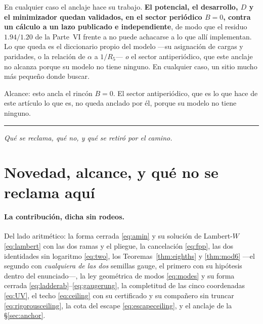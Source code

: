 \documentclass[11pt,a4paper]{article}
\newcommand{\bridge}[1]{\par\medskip\noindent
  \textcolor{hdrblue!45}{\rule{2.2cm}{0.6pt}}\;\;\parbox[t]{0.84\textwidth}{\small\itshape
  \textcolor{hdrblue!85}{#1}}\par\medskip}
\newenvironment{keyeq}
  {\begin{center}\setlength{\fboxsep}{9pt}\setlength{\fboxrule}{0.8pt}%
   \begin{lrbox}{\keyeqbox}\begin{minipage}{0.88\textwidth}}
  {\end{minipage}\end{lrbox}%
   \fcolorbox{hdrblue!55}{hdrblue!6}{\usebox{\keyeqbox}}\end{center}}
\begin{document}
\begin{keyeq}
En cualquier caso el anclaje hace su trabajo. \textbf{El potencial, el desarrollo, $D$ y el
minimizador quedan validados, en el sector periódico $B=0$, contra un cálculo a un lazo publicado e
independiente}, de modo que el residuo $1.94/1.20$ de la Parte~VI frente a \cite{KM25} no puede
achacarse a lo que allí implementan. Lo que queda es el diccionario propio del modelo ---su
asignación de cargas y paridades, o la relación de $\alpha$ a $1/R_5$--- \emph{o} el sector
antiperiódico, que este anclaje no alcanza porque su modelo no tiene ninguno. En cualquier caso, un
sitio mucho más pequeño donde buscar.
\end{keyeq}

\noindent Alcance: esto ancla el rincón $B=0$. El sector antiperiódico, que es lo que hace de
este artículo lo que es, no queda anclado por él, porque su modelo no tiene ninguno.

\bridge{Qué se reclama, qué no, y qué se retiró por el camino.}

\section{Novedad, alcance, y qué no se reclama aquí}\label{sec:novel}

\paragraph{La contribución, dicha sin rodeos.} Del lado aritmético: la forma cerrada
\eqref{eq:amin} y su solución de Lambert-$W$ \eqref{eq:lambert} con las dos ramas y el pliegue, la
cancelación \eqref{eq:fpp}, las dos identidades sin logaritmo \eqref{eq:two}, los
Teoremas~\ref{thm:eighths} y \ref{thm:mod6} ---el segundo con \emph{cualquiera de las dos}
semillas gauge, el primero con su hipótesis dentro del enunciado---, la
ley geométrica de modos \eqref{eq:modes} y su forma cerrada
\eqref{eq:ladderab}--\eqref{eq:gaugerung}, la completitud de las cinco coordenadas \eqref{eq:UV},
el techo \eqref{eq:ceiling} con su certificado y su compañero sin truncar
\eqref{eq:rigorousceiling}, la cota del escape \eqref{eq:escapeceiling}, y el anclaje de la
\S\ref{sec:anchor}.
\end{document}
